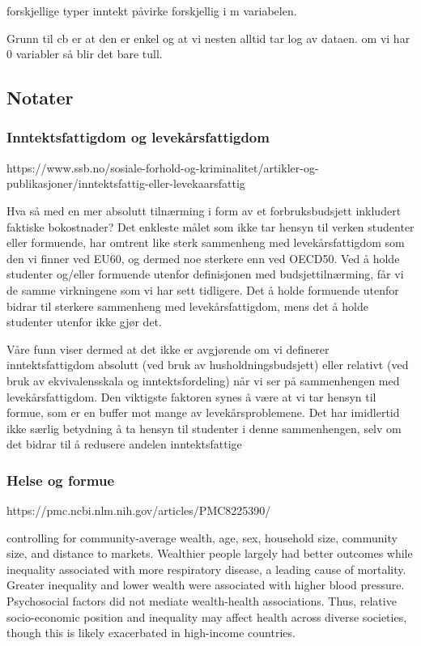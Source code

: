 \documentclass[
  12pt,
  a4paper,
  DIV=11,
  numbers=noendperiod]{scrartcl}
\begin{document}
forskjellige typer inntekt påvirke forskjellig i m variabelen.

Grunn til cb er at den er enkel og at vi nesten alltid tar log av
dataen. om vi har 0 variabler så blir det bare tull.

\subsection{Notater}\label{notater-1}

\subsubsection{Inntektsfattigdom og
levekårsfattigdom}\label{inntektsfattigdom-og-levekuxe5rsfattigdom}

https://www.ssb.no/sosiale-forhold-og-kriminalitet/artikler-og-publikasjoner/inntektsfattig-eller-levekaarsfattig

Hva så med en mer absolutt tilnærming i form av et forbruksbudsjett
inkludert faktiske bokostnader? Det enkleste målet som ikke tar hensyn
til verken studenter eller formuende, har omtrent like sterk sammenheng
med levekårsfattigdom som den vi finner ved EU60, og dermed noe sterkere
enn ved OECD50. Ved å holde studenter og/eller formuende utenfor
definisjonen med budsjettilnærming, får vi de samme virkningene som vi
har sett tidligere. Det å holde formuende utenfor bidrar til sterkere
sammenheng med levekårsfattigdom, mens det å holde studenter utenfor
ikke gjør det.

Våre funn viser dermed at det ikke er avgjørende om vi definerer
inntektsfattigdom absolutt (ved bruk av husholdningsbudsjett) eller
relativt (ved bruk av ekvivalensskala og inntektsfordeling) når vi ser
på sammenhengen med levekårsfattigdom. Den viktigste faktoren synes å
være at vi tar hensyn til formue, som er en buffer mot mange av
levekårsproblemene. Det har imidlertid ikke særlig betydning å ta hensyn
til studenter i denne sammenhengen, selv om det bidrar til å redusere
andelen inntektsfattige

\subsubsection{Helse og formue}\label{helse-og-formue}

https://pmc.ncbi.nlm.nih.gov/articles/PMC8225390/

controlling for community-average wealth, age, sex, household size,
community size, and distance to markets. Wealthier people largely had
better outcomes while inequality associated with more respiratory
disease, a leading cause of mortality. Greater inequality and lower
wealth were associated with higher blood pressure. Psychosocial factors
did not mediate wealth-health associations. Thus, relative
socio-economic position and inequality may affect health across diverse
societies, though this is likely exacerbated in high-income countries.
\end{document}
